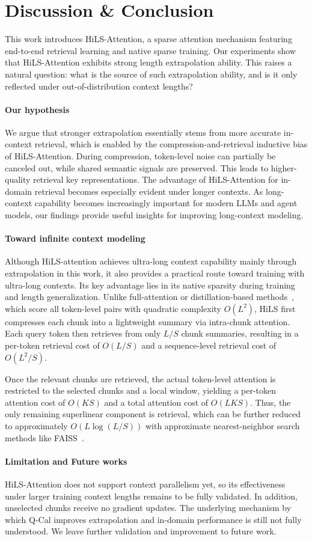 \section{Discussion \& Conclusion}
This work introduces HiLS-Attention, a sparse attention mechanism featuring end-to-end retrieval learning and native sparse training.
Our experiments show that HiLS-Attention exhibits strong length extrapolation ability. This raises a natural question: what is the source of such extrapolation ability, and is it only reflected under out-of-distribution context lengths?
\paragraph{Our hypothesis}
We argue that stronger extrapolation essentially stems from more accurate in-context retrieval, which is enabled by the compression-and-retrieval inductive bias of HiLS-Attention.
During compression, token-level noise can partially be canceled out, while shared semantic signals are preserved. This  leads  to higher-quality retrieval key representations.
The advantage of HiLS-Attention for in-domain retrieval becomes especially evident under longer contexts.
As long-context capability becomes increasingly important for modern LLMs and agent models, our findings provide useful insights for improving long-context modeling.

\paragraph{Toward infinite context modeling}
Although HiLS-attention achieves ultra-long context capability mainly through extrapolation in this work, it also provides a practical route toward training with ultra-long contexts. Its key advantage lies in its native sparsity during training and length generalization. Unlike full-attention or distillation-based methods~\cite{liu2025deepseek}, which score all token-level pairs with quadratic complexity $O(L^2)$, HiLS first compresses each chunk into a lightweight summary via intra-chunk attention. Each query token then retrieves from only $L/S$ chunk summaries, resulting in a per-token retrieval cost of $O(L/S)$ and a sequence-level retrieval cost of $O(L^2/S)$. 

Once the relevant chunks are retrieved, the actual token-level attention is restricted to the selected chunks and a local window, yielding a per-token attention cost of $O(KS)$ and a total attention cost of $O(LKS)$. Thus, the only remaining superlinear component is retrieval, which can be further reduced to approximately $O(L\log(L/S))$ with approximate nearest-neighbor search methods like FAISS~\cite{11202651}.

\paragraph{Limitation and Future works}
HiLS-Attention does not support context parallelism yet, so its effectiveness under larger training context lengths remains to be fully validated. In addition, unselected chunks receive no gradient updates. The underlying mechanism by which Q-Cal improves extrapolation and in-domain performance is still not fully understood. We leave further validation and improvement to future work.